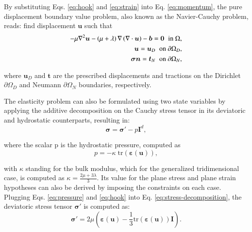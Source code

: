 \documentclass[english,11pt,3p,number,sort&compress]{elsarticle}
\begin{document}
By substituting Eqs. \eqref{eq:hook} and \eqref{eq:strain} into Eq. \eqref{eq:momentum}, the pure displacement boundary value problem, also known as the Navier-Cauchy problem, reads: find displacement $\bm{u}$ such that
\begin{subequations} \label{eq:navier-cauchy}
	\begin{align}
		-\mu\nabla^2\bm{u} -\left(\mu+\lambda \right)\nabla\left(\nabla \cdot \bm{u} \right) - \bm{b} = \bm{0} \hspace{0.2cm} \text{in } \Omega ,&\\
		\bm{u} = \bm{u}_D \hspace{0.2cm} \text{on } \partial\Omega_D ,&\\
		\bm{\sigma} \bm{n} = \bm{t}_N \hspace{0.2cm} \text{on } \partial\Omega_N ,&
	\end{align}
\end{subequations}

\noindent where $\bm{u}_D$ and $\bm{t}$ are the prescribed displacements and tractions on the Dirichlet $\partial\Omega_D$ and Neumann $\partial\Omega_N$ boundaries, respectively.

The elasticity problem can also be formulated using two state variables by applying the additive decomposition on the Cauchy stress tensor in its deviatoric and hydrostatic counterparts, resulting in:
\begin{equation} \label{eq:stress-decomposition}
	\bm{\sigma} = \bm{\sigma}' - p\bm{I}^d ,
\end{equation}

\noindent where the scalar p is the hydrostatic pressure, computed as
\begin{equation} \label{eq:pressure}
	p = -\kappa \;\text{tr}(\bm{\varepsilon}(\bm{u})) ,
\end{equation}

\noindent with $\kappa$ standing for the bulk modulus, which for the generalized tridimensional case, is computed as $\kappa=\frac{2\mu+3\lambda}{3}$. Its value for the plane stress and plane strain hypotheses can also be derived by imposing the constraints on each case. Plugging Eqs. \eqref{eq:pressure} and \eqref{eq:hook} into Eq. \eqref{eq:stress-decomposition}, the deviatoric stress tensor $\boldsymbol{\sigma}'$ is computed as:
\begin{equation} \label{eq:deviatoric-stress}
	\boldsymbol{\sigma}' = 2\mu \left(\boldsymbol{\varepsilon}(\bm{u}) - \frac{1}{3}\text{tr}(\boldsymbol{\varepsilon}(\bm{u}))\bm{I}\right) \text{.}
\end{equation}
\end{document}
